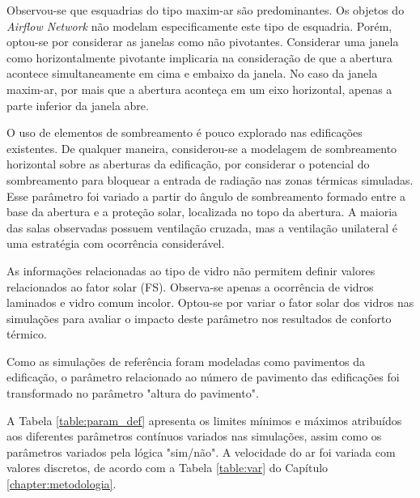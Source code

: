 \documentclass[brazil,hardcopy,openany,a4paper]{ufscthesis}
\begin{document}
	Observou-se que esquadrias do tipo maxim-ar são predominantes. Os objetos do \textit{Airflow Network} não modelam especificamente este tipo de esquadria. Porém, optou-se por considerar as janelas como não pivotantes. Considerar uma janela como horizontalmente pivotante implicaria na consideração de que a abertura acontece simultaneamente em cima e embaixo da janela. No caso da janela maxim-ar, por mais que a abertura aconteça em um eixo horizontal, apenas a parte inferior da janela abre.
	
	O uso de elementos de sombreamento é pouco explorado nas edificações existentes. De qualquer maneira, considerou-se a modelagem de sombreamento horizontal sobre as aberturas da edificação, por considerar o potencial do sombreamento para bloquear a entrada de radiação nas zonas térmicas simuladas. Esse parâmetro foi variado a partir do ângulo de sombreamento formado entre a base da abertura e a proteção solar, localizada no topo da abertura.	
	A maioria das salas observadas possuem ventilação cruzada, mas a ventilação unilateral é uma estratégia com ocorrência considerável.
	
	As informações relacionadas ao tipo de vidro não permitem definir valores relacionados ao fator solar (FS). Observa-se apenas a ocorrência de vidros laminados e vidro comum incolor. Optou-se por variar o fator solar dos vidros nas simulações para avaliar o impacto deste parâmetro nos resultados de conforto térmico.
	
	Como as simulações de referência foram modeladas como pavimentos da edificação, o parâmetro relacionado ao número de pavimento das edificações foi transformado no parâmetro "altura do pavimento".
	
	A Tabela \ref{table:param_def} apresenta os limites mínimos e máximos atribuídos aos diferentes parâmetros contínuos variados nas simulações, assim como os parâmetros variados pela lógica "sim/não". A velocidade do ar foi variada com valores discretos, de acordo com a Tabela \ref{table:var} do Capítulo \ref{chapter:metodologia}.
	
\end{document}
